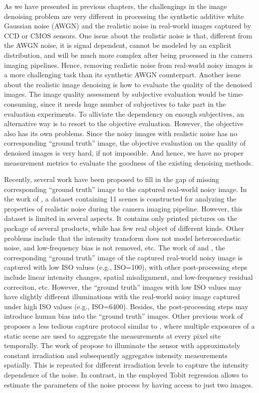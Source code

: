 As we have presented in previous chapters, the challengings in the image denoising problem are very different in processing the synthetic additive white Gaussian noise (AWGN) and the realistic noise in real-world images captured by CCD or CMOS sensors. One issue about the realistic noise is that, different from the AWGN noise, it is signal dependent, cannot be modeled by an explicit distribution, and will be much more complex after being processed in the camera imaging pipelines. Hence, removing realistic noise from real-world noisy images is a more challenging task than its synthetic AWGN counterpart. Another issue about the realistic image denoising is how to evaluate the quality of the denoised images. The image quality assessment by subjective evaluation would be time-consuming, since it needs huge number of subjectives to take part in the evaluation experiments. To alliviate the dependency on enough subjectives, an alternative way is to resort to the objective evaluation. However, the objective also has its own problems. Since the noisy images with realistic noise has no corresponding ``ground truth'' image, the objective evaluation on the quality of denoised images is very hard, if not impossible. And hence, we have no proper measurement metrics to evaluate the goodness of the existing denoising methods.

Recently, several work have been proposed to fill in the gap of missing corresponding ``ground truth'' image to the captured real-world noisy image. In the work of \cite{crosschannel2016}, a dataset containing 11 scenes is constructed for analyzing the properties of realistic noise during the camera imaging pipeline. However, this dataset is limited in several aspects. It contains only printed pictures on the package of several products, while has few real object of different kinds. Other problems include that the intensity transform does not model heteroscedastic noise, and low-frequency bias is not removed, etc. The work of \cite{RENOIR2014} and \cite{dnd2017}, the corresponding ``ground truth'' image of the captured real-world noisy image is captured with low ISO values (e.g., ISO=100), with other post-processing steps include linear intensity changes, spatial misalignment, and low-frequency residual correciton, etc. However, the ``ground truth'' images with low ISO values may have slightly different illuminations with the real-world noisy image captured under high ISO values (e.g., ISO=6400). Besides, the post-processing steps may introduce human bias into the ``ground truth'' images. Other previous work of \cite{EMVA1288} proposes a less tedious capture protocol similar to \cite{dnd2017}, where multiple exposures of a static scene are used to aggregate the measurements at every pixel site temporally. The work of \cite{noisemeasurement,moldovan2006denoising} propose to illuminate the sensor with approximately constant irradiation and subsequently aggregates intensity measurements spatially. This is repeated for different irradiation levels to capture the intensity dependence of the noise. In contrast, in \cite{dnd2017} the employed Tobit regression allows to estimate the parameters of the noise process by having access to just two images.

